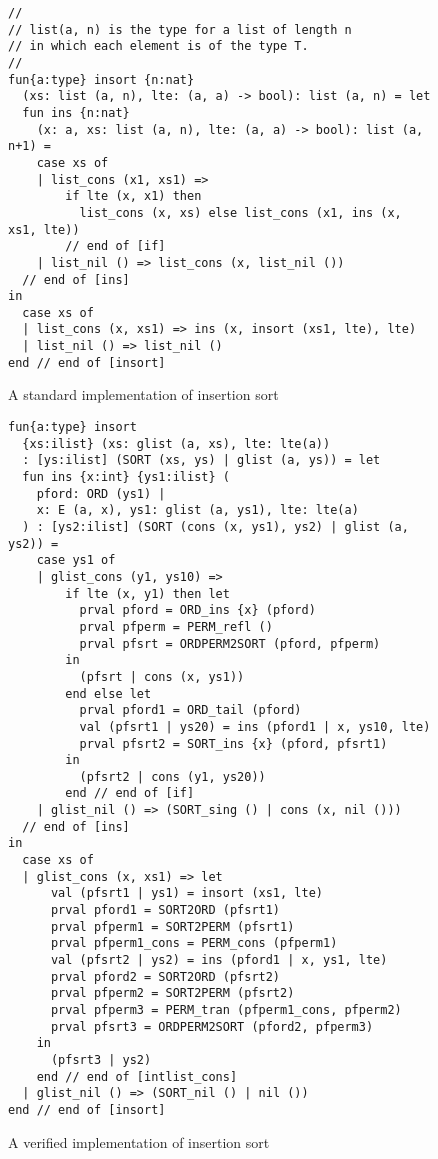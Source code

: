 \documentclass{llncs}
\begin{document}
\begin{figure}[thp]
\begin{verbatim}
//
// list(a, n) is the type for a list of length n
// in which each element is of the type T.
//
fun{a:type} insort {n:nat}
  (xs: list (a, n), lte: (a, a) -> bool): list (a, n) = let
  fun ins {n:nat}
    (x: a, xs: list (a, n), lte: (a, a) -> bool): list (a, n+1) =
    case xs of
    | list_cons (x1, xs1) =>
        if lte (x, x1) then
          list_cons (x, xs) else list_cons (x1, ins (x, xs1, lte))
        // end of [if]
    | list_nil () => list_cons (x, list_nil ())
  // end of [ins]
in
  case xs of
  | list_cons (x, xs1) => ins (x, insort (xs1, lte), lte)
  | list_nil () => list_nil ()
end // end of [insort]
\end{verbatim}
\caption{A standard implementation of insertion sort}
\label{figure:standard_insertion_sort}
\end{figure}
\begin{figure}
\begin{verbatim}
fun{a:type} insort
  {xs:ilist} (xs: glist (a, xs), lte: lte(a))
  : [ys:ilist] (SORT (xs, ys) | glist (a, ys)) = let
  fun ins {x:int} {ys1:ilist} (
    pford: ORD (ys1) |
    x: E (a, x), ys1: glist (a, ys1), lte: lte(a)
  ) : [ys2:ilist] (SORT (cons (x, ys1), ys2) | glist (a, ys2)) =
    case ys1 of
    | glist_cons (y1, ys10) =>
        if lte (x, y1) then let
          prval pford = ORD_ins {x} (pford)
          prval pfperm = PERM_refl ()
          prval pfsrt = ORDPERM2SORT (pford, pfperm)
        in
          (pfsrt | cons (x, ys1))
        end else let
          prval pford1 = ORD_tail (pford)
          val (pfsrt1 | ys20) = ins (pford1 | x, ys10, lte)
          prval pfsrt2 = SORT_ins {x} (pford, pfsrt1)
        in
          (pfsrt2 | cons (y1, ys20))
        end // end of [if]
    | glist_nil () => (SORT_sing () | cons (x, nil ()))
  // end of [ins]
in
  case xs of
  | glist_cons (x, xs1) => let
      val (pfsrt1 | ys1) = insort (xs1, lte)
      prval pford1 = SORT2ORD (pfsrt1)
      prval pfperm1 = SORT2PERM (pfsrt1)
      prval pfperm1_cons = PERM_cons (pfperm1)
      val (pfsrt2 | ys2) = ins (pford1 | x, ys1, lte)
      prval pford2 = SORT2ORD (pfsrt2)
      prval pfperm2 = SORT2PERM (pfsrt2)
      prval pfperm3 = PERM_tran (pfperm1_cons, pfperm2)
      prval pfsrt3 = ORDPERM2SORT (pford2, pfperm3)
    in
      (pfsrt3 | ys2)
    end // end of [intlist_cons]
  | glist_nil () => (SORT_nil () | nil ())
end // end of [insort]
\end{verbatim}
\caption{A verified implementation of insertion sort}
\label{figure:verified_insertion_sort}
\end{figure}
\end{document}
